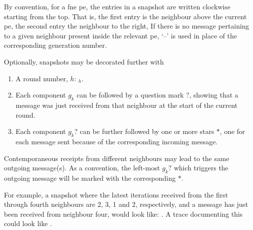 By convention, for a \gls{fne} \gls{pe}, the entries in a snapshot are written clockwise starting from the top.  That is, the first entry is the neighbour above the current \gls{pe}, the second entry the neighbour to the right, \etc{}  If there is no message pertaining to a given neighbour present inside the relevant \gls{pe}, `--' is used in place of the corresponding generation number.

Optionally, snapshots may be decorated further with 
{\renewcommand{\theenumi}{\alph{enumi}}
\begin{enumerate}
    \item A round number, \(h\): \(_h\).
    \item Each component \(g_k\) can be followed by a question mark \(?\), showing that a message was just received from that neighbour at the start of the current round.
    \item Each component \(g_k?\) can be further followed by one or more stars \(*\), one for each message sent because of the corresponding incoming message.
\end{enumerate}}

Contemporaneous receipts from different neighbours may lead to the same outgoing message(s).  As a convention, the left-most \(g_k?\) which triggers the outgoing message will be marked with the corresponding \(*\).

For example, a snapshot where the latest iterations received from the first through fourth neighbours are 2, 3, 1 and 2, respectively, and a message has just been received from neighbour four, would look like:  .  A trace documenting this could look like  \tarr{} .